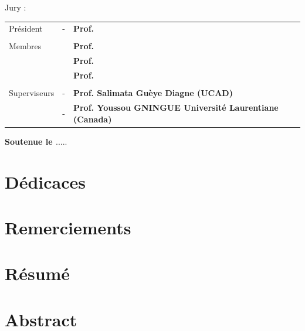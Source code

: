 \documentclass[a4paper,11pt,oneside]{report}
\theoremstyle{plain}
\newcommand{\0}{/ \! \! \! 0}
\theoremstyle{plain}
\begin{document}
\begin{titlepage}
\begin{center}
Jury :\\
\end{center}
\begin{tabular}{lcl}
Pr\'esident  &-& {\bf  Prof.       }\\
           & &                                                                            \\
Membres    & & {\bf Prof.            }\\             
           & & {\bf Prof.            } \\ 
           & & {\bf Prof.            }  \\
           & &                                                                             \\
Superviseurs &-& {\bf Prof. Salimata Gu\`eye Diagne (UCAD)   }      \\
            &-& {\bf Prof. Youssou GNINGUE Universit\'e Laurentiane (Canada)}
\end{tabular}

\vspace{1cm}

\begin{center}
{\bf Soutenue le $.....$}
\end{center}

\end{titlepage}


\chapter*{D\'edicaces}






\chapter*{Remerciements}




\chapter*{R\'esum\'e}






\chapter*{Abstract}
\end{document}
